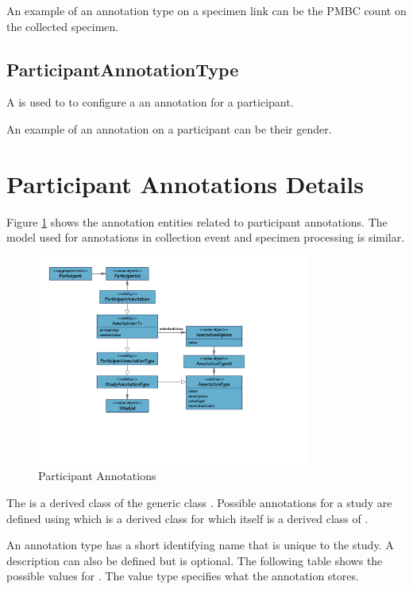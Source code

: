An example of an annotation type on a specimen link can be the PMBC count on
the collected specimen.

\subsection*{ParticipantAnnotationType}
A  is used to to configure a an
annotation for a participant.

An example of an annotation on a participant can be their gender.

\section{Participant Annotations Details}
Figure \ref{fig-participant-annotations} shows the annotation entities related
to participant annotations. The model used for annotations in collection event
and specimen processing is similar.

\begin{figure}[H]
  \centering
  \includegraphics[trim={10mm 45mm 62mm 10mm}, clip,
    width=0.8\textwidth]{images/participant-annotations}
  \caption{Participant Annotations}
  \label{fig-participant-annotations}
\end{figure}

The  is a derived class of the generic class
. Possible annotations for a study are defined using
 which is a derived class for
 which itself is a derived class of
.

An annotation type has a short identifying name that is unique to the study. A
description can also be defined but is optional. The following table shows the
possible values for . The value type specifies what the
annotation stores.

